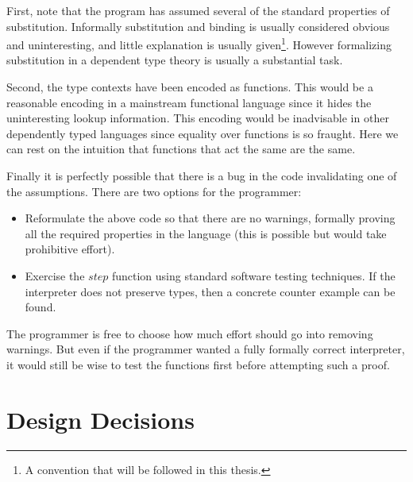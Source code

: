 First, note that the program has assumed several of the standard properties of substitution.
Informally substitution and binding is usually considered obvious and uninteresting, and little explanation is usually given\footnote{
  A convention that will be followed in this thesis.
}.
However formalizing substitution in a dependent type theory is usually a substantial task\cite{10.1145/3293880.3294101}.

Second, the type contexts have been encoded as functions.
This would be a reasonable encoding in a mainstream functional language since it hides the uninteresting lookup information.
This encoding would be inadvisable in other dependently typed languages since equality over functions is so fraught.
Here we can rest on the intuition that functions that act the same are the same.

Finally it is perfectly possible that there is a bug in the code invalidating one of the assumptions.
There are two options for the programmer:
\begin{itemize}
\item Reformulate the above code so that there are no warnings, formally proving all the required properties in the language (this is possible but would take prohibitive effort).
\item Exercise the $step$ function using standard software testing techniques.
If the interpreter does not preserve types, then a concrete counter example can be found.
\end{itemize}
The programmer is free to choose how much effort should go into removing warnings.
But even if the programmer wanted a fully formally correct interpreter, it would still be wise to test the functions first before attempting such a proof.



\section{Design Decisions}

